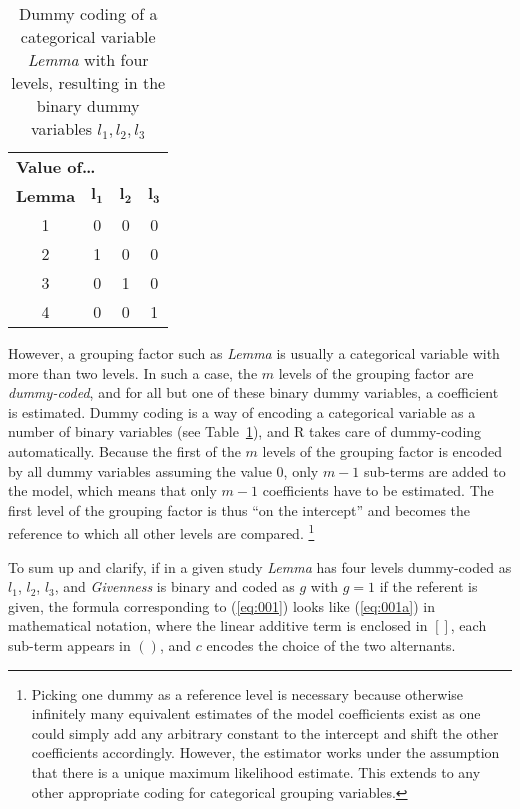 \begin{table}
  \centering
  \begin{tabular}{cccc}
    \toprule
    \multicolumn{4}{l}{\textbf{Value of\ldots}} \\
    \textbf{Lemma} & $\mathbf{l_1}$ & $\mathbf{l_2}$ & $\mathbf{l_3}$ \\
    \midrule
    1 & 0 & 0 & 0 \\ 
    2 & 1 & 0 & 0 \\ 
    3 & 0 & 1 & 0 \\ 
    4 & 0 & 0 & 1 \\ 
    \bottomrule
  \end{tabular}
  \caption{Dummy coding of a categorical variable \textit{Lemma} with four levels, resulting in the binary dummy variables $l_1,l_2,l_3$}
  \label{tab:dummy}
\end{table}

However, a grouping factor such as \textit{Lemma} is usually a categorical variable with more than two levels.
In such a case, the $m$ levels of the grouping factor are \textit{dummy-coded}, and for all but one of these binary dummy variables, a coefficient is estimated.
Dummy coding is a way of encoding a categorical variable as a number of binary variables (see Table~\ref{tab:dummy}), and R takes care of dummy-coding automatically.
Because the first of the $m$ levels of the grouping factor is encoded by all dummy variables assuming the value 0, only $m-1$ sub-terms are added to the model, which means that only $m-1$ coefficients have to be estimated.
The first level of the grouping factor is thus ``on the intercept'' and becomes the reference to which all other levels are compared.%
\footnote{Picking one dummy as a reference level is necessary because otherwise infinitely many equivalent estimates of the model coefficients exist as one could simply add any arbitrary constant to the intercept and shift the other coefficients accordingly.
However, the estimator works under the assumption that there is a unique maximum likelihood estimate.
This extends to any other appropriate coding for categorical grouping variables.
}

To sum up and clarify, if in a given study \textit{Lemma} has four levels dummy-coded as $l_1$, $l_2$, $l_3$, and \textit{Givenness} is binary and coded as $g$ with $g=1$ if the referent is given, the formula corresponding to (\ref{eq:001}) looks like (\ref{eq:001a}) in mathematical notation, where the linear additive term is enclosed in $[ ]$, each sub-term appears in $( )$, and $c$ encodes the choice of the two alternants.

